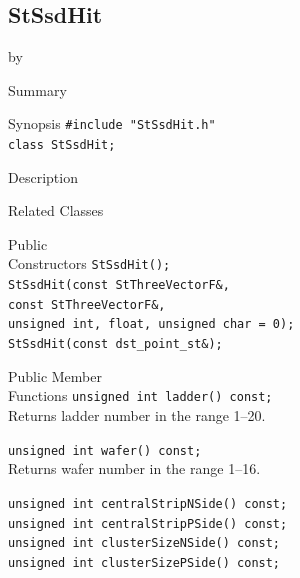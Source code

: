 \documentclass[twoside]{article}
\newcommand{\entrylabel}[1]{\mbox{\textbf{{#1}}}\hfil}%
\newenvironment{entry}
{\begin{list}{}%
    {\renewcommand{\makelabel}{\entrylabel}%
     \setlength{\labelwidth}{90pt}%
     \setlength{\leftmargin}{\labelwidth}
     \advance\leftmargin by \labelsep%
      }%
    }%
  {\end{list}}
\newcommand{\Entrylabel}[1]%
{\raisebox{0pt}[1ex][0pt]{\makebox[\labelwidth][l]%
    {\parbox[t]{\labelwidth}{\hspace{0pt}\textbf{{#1}}}}}}
\newenvironment{Entry}%
{\renewcommand{\entrylabel}{\Entrylabel}\begin{entry}}%
  {\end{entry}}
\begin{document}
\subsection{StSsdHit}
\label{sec:StSsdHit}
\begin{Entry}
\item[Summary]
\item[Synopsis]
    \verb+#include "StSsdHit.h"+\\
    \verb+class StSsdHit;+\\
\item[Description]
\item[Related Classes]
\item[Public\\ Constructors]
    \verb+StSsdHit();+\\
    \verb+StSsdHit(const StThreeVectorF&,+\\
    \verb+const StThreeVectorF&,+\\
    \verb+unsigned int, float, unsigned char = 0);+\\
    \verb+StSsdHit(const dst_point_st&);+\\
\item[Public Member\\ Functions]
    \verb+unsigned int ladder() const;+\\
    Returns ladder number in the range 1--20.
    
    \verb+unsigned int wafer() const;+\\
    Returns wafer number in the range 1--16.
    
    \verb+unsigned int centralStripNSide() const;+\\
    \verb+unsigned int centralStripPSide() const;+\\
    \verb+unsigned int clusterSizeNSide() const;+\\
    \verb+unsigned int clusterSizePSide() const;+\\
\end{Entry}
\clearpage
\end{document}
